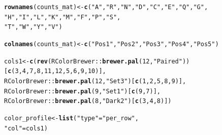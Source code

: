 \documentclass[12pt]{article}\usepackage[]{graphicx}\usepackage[usenames,dvipsnames]{color}
\makeatletter
\newcommand{\hlnum}[1]{\textcolor[rgb]{0.686,0.059,0.569}{#1}}%
\newcommand{\hlstr}[1]{\textcolor[rgb]{0.192,0.494,0.8}{#1}}%
\newcommand{\hlopt}[1]{\textcolor[rgb]{0,0,0}{#1}}%
\newcommand{\hlstd}[1]{\textcolor[rgb]{0.345,0.345,0.345}{#1}}%
\newcommand{\hlkwb}[1]{\textcolor[rgb]{0.69,0.353,0.396}{#1}}%
\newcommand{\hlkwd}[1]{\textcolor[rgb]{0.737,0.353,0.396}{\textbf{#1}}}%
\newenvironment{kframe}{%
 \def\at@end@of@kframe{}%
 \ifinner\ifhmode%
  \def\at@end@of@kframe{\end{minipage}}%
  \begin{minipage}{\columnwidth}%
 \fi\fi%
 \def\FrameCommand##1{\hskip\@totalleftmargin \hskip-\fboxsep
 \colorbox{shadecolor}{##1}\hskip-\fboxsep
     \hskip-\linewidth \hskip-\@totalleftmargin \hskip\columnwidth}%
 \MakeFramed {\advance\hsize-\width
   \@totalleftmargin\z@ \linewidth\hsize
   \@setminipage}}%
 {\par\unskip\endMakeFramed%
 \at@end@of@kframe}
\newenvironment{knitrout}{}{} %
\makeatother
\begin{document}
\begin{figure}[htp]
\begin{center}
\begin{knitrout}
\color{fgcolor}\begin{kframe}
\begin{alltt}
\hlkwd{rownames}\hlstd{(counts_mat)} \hlkwb{<-} \hlkwd{c}\hlstd{(}\hlstr{"A"}\hlstd{,} \hlstr{"R"}\hlstd{,} \hlstr{"N"}\hlstd{,} \hlstr{"D"}\hlstd{,}\hlstr{"C"}\hlstd{,} \hlstr{"E"}\hlstd{,} \hlstr{"Q"}\hlstd{,} \hlstr{"G"}\hlstd{,}
                          \hlstr{"H"}\hlstd{,} \hlstr{"I"}\hlstd{,} \hlstr{"L"}\hlstd{,} \hlstr{"K"}\hlstd{,} \hlstr{"M"}\hlstd{,} \hlstr{"F"}\hlstd{,} \hlstr{"P"}\hlstd{,} \hlstr{"S"}\hlstd{,}
                          \hlstr{"T"}\hlstd{,} \hlstr{"W"}\hlstd{,} \hlstr{"Y"}\hlstd{,} \hlstr{"V"}\hlstd{)}

\hlkwd{colnames}\hlstd{(counts_mat)} \hlkwb{<-} \hlkwd{c}\hlstd{(}\hlstr{"Pos 1"}\hlstd{,} \hlstr{"Pos 2"}\hlstd{,} \hlstr{"Pos 3"}\hlstd{,} \hlstr{"Pos 4"}\hlstd{,} \hlstr{"Pos 5"}\hlstd{)}

\hlstd{cols1} \hlkwb{<-} \hlkwd{c}\hlstd{(}\hlkwd{rev}\hlstd{(RColorBrewer}\hlopt{::}\hlkwd{brewer.pal}\hlstd{(}\hlnum{12}\hlstd{,} \hlstr{"Paired"}\hlstd{))[}\hlkwd{c}\hlstd{(}\hlnum{3}\hlstd{,}\hlnum{4}\hlstd{,}\hlnum{7}\hlstd{,}\hlnum{8}\hlstd{,}\hlnum{11}\hlstd{,}\hlnum{12}\hlstd{,}\hlnum{5}\hlstd{,}\hlnum{6}\hlstd{,}\hlnum{9}\hlstd{,}\hlnum{10}\hlstd{)],}
           \hlstd{RColorBrewer}\hlopt{::}\hlkwd{brewer.pal}\hlstd{(}\hlnum{12}\hlstd{,} \hlstr{"Set3"}\hlstd{)[}\hlkwd{c}\hlstd{(}\hlnum{1}\hlstd{,}\hlnum{2}\hlstd{,}\hlnum{5}\hlstd{,}\hlnum{8}\hlstd{,}\hlnum{9}\hlstd{)],}
           \hlstd{RColorBrewer}\hlopt{::}\hlkwd{brewer.pal}\hlstd{(}\hlnum{9}\hlstd{,} \hlstr{"Set1"}\hlstd{)[}\hlkwd{c}\hlstd{(}\hlnum{9}\hlstd{,}\hlnum{7}\hlstd{)],}
           \hlstd{RColorBrewer}\hlopt{::}\hlkwd{brewer.pal}\hlstd{(}\hlnum{8}\hlstd{,} \hlstr{"Dark2"}\hlstd{)[}\hlkwd{c}\hlstd{(}\hlnum{3}\hlstd{,}\hlnum{4}\hlstd{,}\hlnum{8}\hlstd{)])}

\hlstd{color_profile} \hlkwb{<-} \hlkwd{list}\hlstd{(}\hlstr{"type"} \hlstd{=} \hlstr{"per_row"}\hlstd{,}
                      \hlstr{"col"} \hlstd{= cols1)}


\end{alltt}
\end{kframe}
\end{knitrout}
\end{center}
\end{figure}
\end{document}
